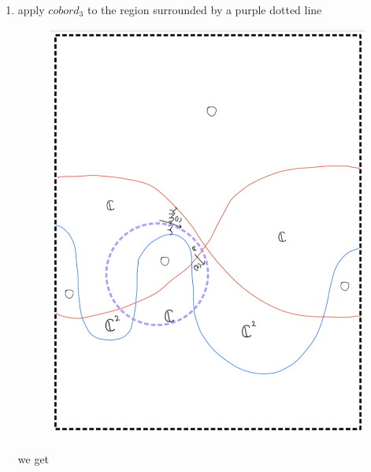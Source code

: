 \begin{enumerate}[label=(Step \arabic*)]
\item apply $cobord_3$ to the region surrounded by a purple dotted line

\begin{figure}[H]
    \centering
    \includegraphics[scale = 0.95]{diagrams/cobord8/10.png}
    \caption{}
    \label{fig:your-label}
\end{figure}

we get


\end{enumerate}
